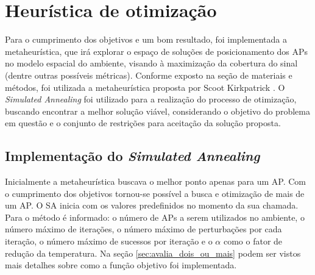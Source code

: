 \documentclass[
	12pt,				%
	twoside,			%
	a4paper,			%
	english,			%
	french,				%
	spanish,			%
	brazil				%
	]{abntex2}
\begin{document}
\section{Heurística de
otimização}\label{heuruxedstica-de-otimizauxe7uxe3o}

Para o cumprimento dos objetivos e um bom resultado, foi implementada a
metaheurística, que irá explorar o espaço de soluções de posicionamento
dos APs no modelo espacial do ambiente, visando à maximização da
cobertura do sinal (dentre outras possíveis métricas). Conforme exposto
na seção de materiais e métodos, foi utilizada a metaheurística proposta
por Scoot Kirkpatrick \cite{PATRICK}. O \emph{Simulated Annealing} foi
utilizado para a realização do processo de otimização, buscando
encontrar a melhor solução viável, considerando o objetivo do problema
em questão e o conjunto de restrições para aceitação da solução
proposta.

\subsection{\texorpdfstring{Implementação do \emph{Simulated
Annealing}}{Implementação do Simulated Annealing}}\label{implementauxe7uxe3o-do-simulated-annealing}

Inicialmente a metaheurística buscava o melhor ponto apenas para um AP.
Com o cumprimento dos objetivos tornou-se possível a busca e otimização
de mais de um AP. O SA inicia com os valores predefinidos no momento da
sua chamada. Para o método é informado: o número de APs a serem
utilizados no ambiente, o número máximo de iterações, o número máximo de
perturbações por cada iteração, o número máximo de sucessos por iteração
e o \(\alpha\) como o fator de redução da temperatura. Na seção
\ref{sec:avalia_dois_ou_mais} podem ser vistos mais detalhes sobre como
a função objetivo foi implementada.
\end{document}
